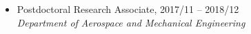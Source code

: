 \documentclass[10pt]{article}
\newenvironment{myitemize}
{ \begin{itemize}
    \setlength{\itemsep}{0pt}
    \setlength{\parskip}{0pt}
    \setlength{\parsep}{0pt}     }
{ \end{itemize}                  }
\begin{document}
\begin{myitemize}
\item Postdoctoral Research Associate, 2017/11 -- 2018/12 \\
{\em Department of Aerospace and Mechanical Engineering}
\end{myitemize}

\end{document}
